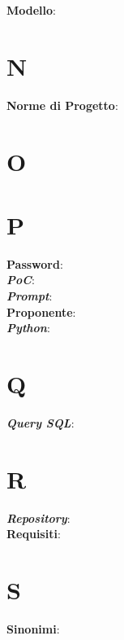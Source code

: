 \documentclass[5pt]{article}
\begin{document}
\textbf{Modello}: \\

\section*{N}

\textbf{Norme di Progetto}: \\

\section*{O}

\section*{P}

\textbf{Password}: \\

\textbf{\textit{PoC}}: \\

\textbf{\textit{Prompt}}: \\

\textbf{Proponente}: \\

\textbf{\textit{Python}}: \\

\section*{Q}

\textbf{\textit{Query SQL}}: \\

\section*{R}

\textbf{\textit{Repository}}: \\

\textbf{Requisiti}: \\

\section*{S}

\textbf{Sinonimi}: \\
\end{document}
